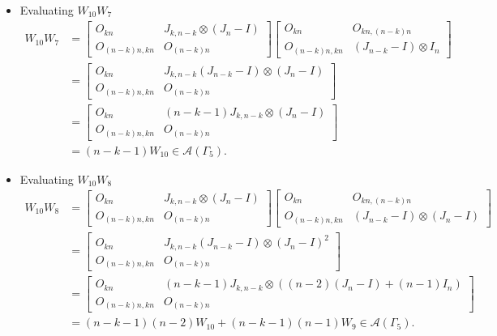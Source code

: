 \begin{itemize}
\item Evaluating $W_{10}W_{7}$
\begin{align*}
    W_{10}W_7
    &= \begin{bmatrix}
        O_{kn} & J_{k,n-k} \otimes (J_n-I) \\
        O_{(n-k)n,kn} & O_{(n-k)n}
    \end{bmatrix}\begin{bmatrix}
        O_{kn} & O_{kn, (n-k)n} \\
        O_{(n-k)n,kn} & (J_{n-k}-I) \otimes I_n
    \end{bmatrix}\\
    &= \begin{bmatrix}
        O_{kn} & J_{k,n-k}(J_{n-k}-I) \otimes (J_n-I) \\
        O_{(n-k)n,kn} & O_{(n-k)n}
    \end{bmatrix}\\
    &= \begin{bmatrix}
        O_{kn} & (n-k-1)J_{k,n-k} \otimes (J_n-I) \\
        O_{(n-k)n,kn} & O_{(n-k)n}
    \end{bmatrix}\\
    &=(n-k-1)W_{10}\in\mathcal{A}(\Gamma_5).
\end{align*}

\item Evaluating $W_{10}W_{8}$
\begin{align*}
    W_{10}W_8
    &= \begin{bmatrix}
        O_{kn} & J_{k,n-k} \otimes (J_n-I) \\
        O_{(n-k)n,kn} & O_{(n-k)n}
    \end{bmatrix}\begin{bmatrix}
        O_{kn} & O_{kn, (n-k)n} \\
        O_{(n-k)n,kn} & (J_{n-k}-I) \otimes (J_n-I)
    \end{bmatrix}\\
    &= \begin{bmatrix}
        O_{kn} & J_{k,n-k}(J_{n-k}-I) \otimes (J_n-I)^2 \\
        O_{(n-k)n,kn} & O_{(n-k)n}
    \end{bmatrix}\\
    &= \begin{bmatrix}
        O_{kn} & (n-k-1)J_{k,n-k} \otimes ((n-2)(J_n-I) + (n-1)I_n) \\
        O_{(n-k)n,kn} & O_{(n-k)n}
    \end{bmatrix}\\
    &=(n-k-1)(n-2)W_{10} + (n-k-1)(n-1)W_9\in\mathcal{A}(\Gamma_5).
\end{align*}


\end{itemize}
